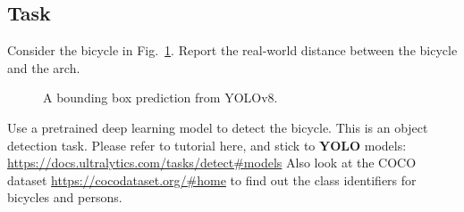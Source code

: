 \documentclass[12pt,a4paper]{article}
\begin{document}
\subsection{Task}
Consider the bicycle in
Fig.~\ref{fig:bicycleBBox}. Report the real-world distance between the
bicycle and the arch.

\begin{figure}[h!]
\centering
\caption{A bounding box prediction from YOLOv8.}
\label{fig:bicycleBBox}
\end{figure}

Use a pretrained deep learning model to detect the
bicycle. This is an object detection task. Please refer to tutorial here, and stick to \textbf{YOLO} models: \url{https://docs.ultralytics.com/tasks/detect#models}
Also look at the COCO dataset \url{https://cocodataset.org/#home} to find out the class identifiers for bicycles and persons.
\end{document}
